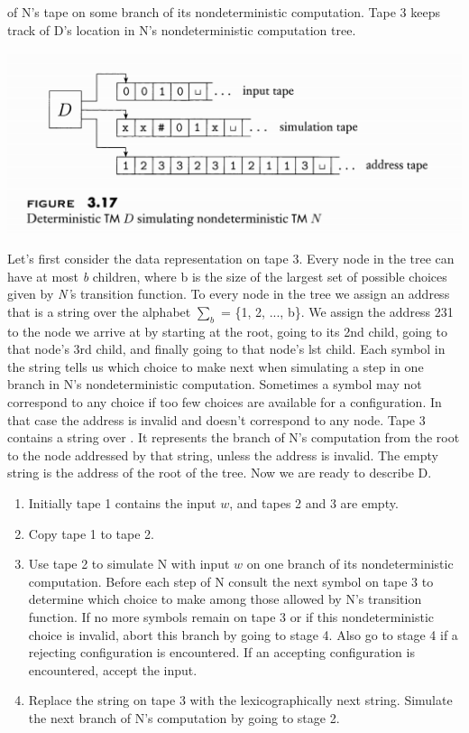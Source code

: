 \documentclass[main.tex]{subfiles}
\begin{document}
of N’s tape on some branch of its nondeterministic computation. Tape 3 keeps
track of D’s location in N’s nondeterministic computation tree.
\begin{center}
    \includegraphics[scale=0.47]{images/figure317.png}
\end{center}
Let’s first consider the data representation on tape 3. Every node in the tree
can have at most \textit{b} children, where b is the size of the largest set of possible
choices given by \textit{N’}s transition function. To every node in the tree we assign an
address that is a string over the alphabet $\sum_{b}$ = \{1, 2, ..., b\}. We assign the address 231 to the node we arrive at by starting at the root, going to its 2nd child,
going to that node’s 3rd child, and finally going to that node’s lst child. Each
symbol in the string tells us which choice to make next when simulating a step in
one branch in N’s nondeterministic computation. Sometimes a symbol may not
correspond to any choice if too few choices are available for a configuration. In
that case the address is invalid and doesn’t correspond to any node. Tape 3 contains a string over . It represents the branch of N’s computation from the root
to the node addressed by that string, unless the address is invalid. The empty
string is the address of the root of the tree. Now we are ready to describe D.
\begin{enumerate}[label=\textbf{\arabic*}]
    \item Initially tape 1 contains the input $w$, and tapes 2 and 3 are empty.
    \item Copy tape 1 to tape 2.
    \item Use tape 2 to simulate N with input $w$ on one branch of its nondeterministic computation. Before each step of N consult the next symbol on tape 3
to determine which choice to make among those allowed by N’s transition
function. If no more symbols remain on tape 3 or if this nondeterministic
choice is invalid, abort this branch by going to stage 4. Also go to stage 4
if a rejecting configuration is encountered. If an accepting configuration is
encountered, accept the input.
    \item Replace the string on tape 3 with the lexicographically next string. Simulate the next branch of N’s computation by going to stage 2. 
\end{enumerate}
\end{document}
